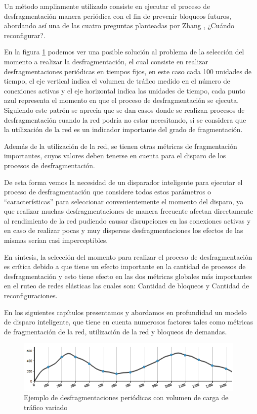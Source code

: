 Un método ampliamente utilizado consiste en ejecutar el proceso de desfragmentación manera periódica con el fin de prevenir bloqueos futuros, abordando así una de las cuatro preguntas planteadas por Zhang \cite{zhang2014dynamic}, ¿Cuándo reconfigurar?.

En la figura \ref{fig:ejemploPeriodico} podemos ver una posible solución al problema de la selección del momento a realizar la desfragmentación, el cual consiste en realizar desfragmentaciones periódicas en tiempos fijos, en este caso cada 100 unidades de tiempo, el eje vertical indica el volumen de tráfico medido en el número de conexiones activas y el eje horizontal indica las unidades de tiempo, cada punto azul representa el momento en que el proceso de desfragmentación se ejecuta. Siguiendo este patrón se aprecia que se dan casos donde se realizan procesos de desfragmentación cuando la red podría no estar necesitando, si se considera que la utilización de la red es un indicador importante del grado de fragmentación. 

Además de la utilización de la red, se tienen otras métricas de fragmentación importantes, cuyos valores deben tenerse en cuenta para el disparo de los procesos de desfragmentación.

De esta forma vemos la necesidad de un disparador inteligente para ejecutar el proceso de desfragmentación que considere todos estos parámetros o ``características'' para seleccionar convenientemente el momento del disparo, ya que realizar muchas desfragmentaciones de manera frecuente afectan directamente al rendimiento de la red pudiendo causar disrupciones en las conexiones activas y en caso de realizar pocas y muy dispersas desfragmentaciones los efectos de las mismas serían casi imperceptibles.

En síntesis, la selección del momento para realizar el proceso de desfragmentación es crítica debido a que tiene un efecto importante en la cantidad de procesos de desfragmentación y esto tiene efecto en las dos métricas globales más importantes en el ruteo de redes elásticas las cuales son: Cantidad de bloqueos y Cantidad de reconfiguraciones. 

En los siguientes capítulos presentamos y abordamos en profundidad un modelo de disparo inteligente, que tiene en cuenta numerosos factores tales como métricas de fragmentación de la red, utilización de la red y bloqueos de demandas.
 
\begin{figure}[h!]
    \centering
    \includegraphics[width=1\textwidth]{capitulos/img/ejemploPeriodico.png}
    \caption{Ejemplo de desfragmentaciones periódicas con volumen de carga de tráfico variado}
    \label{fig:ejemploPeriodico}
\end{figure}



